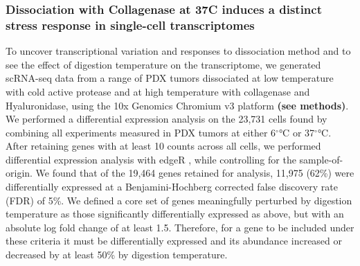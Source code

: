 \subsubsection{Dissociation with Collagenase at 37\textdegree C induces a distinct stress response in single-cell transcriptomes}
To uncover transcriptional variation and responses to dissociation method and to see the effect of digestion temperature on the transcriptome, we generated scRNA-seq data from a range of PDX tumors dissociated at low temperature with cold active protease and at high temperature with collagenase and Hyaluronidase, using the 10x Genomics Chromium v3 platform \textbf{(see methods)}.
We performed a differential expression analysis on the 23,731 cells found by combining all experiments measured in PDX tumors at either 6$^{\circ}$°C or 37$^{\circ}$°C. After retaining genes with at least 10 counts across all cells, we performed differential expression analysis with edgeR \cite{robinson2010edger}, while controlling for the sample-of-origin.
We found that of the 19,464 genes retained for analysis, 11,975 (62\%) were differentially expressed at a Benjamini-Hochberg corrected false discovery rate (FDR) of 5\%. We defined a core set of genes meaningfully perturbed by digestion temperature as those significantly differentially expressed as above, but with an absolute log fold change of at least 1.5. Therefore, for a gene to be included under these criteria it must be differentially expressed and its abundance increased or decreased by at least 50\% by digestion temperature. 



